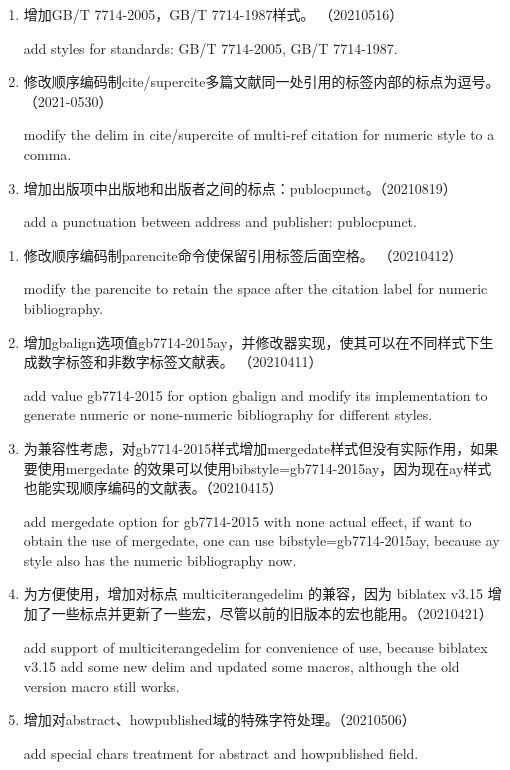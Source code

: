 \label{up:20210819}

\begin{enumerate}
\item 增加GB/T 7714-2005，GB/T 7714-1987样式。 （20210516）

add styles for standards: GB/T 7714-2005, GB/T 7714-1987.

\item 修改顺序编码制cite/supercite多篇文献同一处引用的标签内部的标点为逗号。（2021-0530）

modify the delim in cite/supercite of multi-ref citation for numeric style to a comma.

\item 增加出版项中出版地和出版者之间的标点：publocpunct。（20210819）

add a punctuation between address and publisher: publocpunct.


\end{enumerate}


\label{up:20210506}

\begin{enumerate}
\item 修改顺序编码制parencite命令使保留引用标签后面空格。 （20210412）

modify the parencite to retain the space after the citation label for numeric bibliography.


\item 增加gbalign选项值gb7714-2015ay，并修改器实现，使其可以在不同样式下生成数字标签和非数字标签文献表。 （20210411）

add value gb7714-2015 for option gbalign and modify its implementation to generate numeric or none-numeric bibliography for different styles.

\item 为兼容性考虑，对gb7714-2015样式增加mergedate样式但没有实际作用，如果要使用mergedate 的效果可以使用bibstyle=gb7714-2015ay，因为现在ay样式也能实现顺序编码的文献表。（20210415）

add mergedate option for gb7714-2015 with none actual effect, if want to obtain the use of mergedate, one can use bibstyle=gb7714-2015ay, because ay style also has the numeric bibliography now.

\item 为方便使用，增加对标点 multiciterangedelim 的兼容，因为 biblatex v3.15 增加了一些标点并更新了一些宏，尽管以前的旧版本的宏也能用。（20210421）

add support of multiciterangedelim for convenience of use, because biblatex v3.15 add some new delim and updated some macros, although the old version macro still works.

\item 增加对abstract、howpublished域的特殊字符处理。（20210506）

add special chars treatment for abstract and howpublished field.

\end{enumerate}

